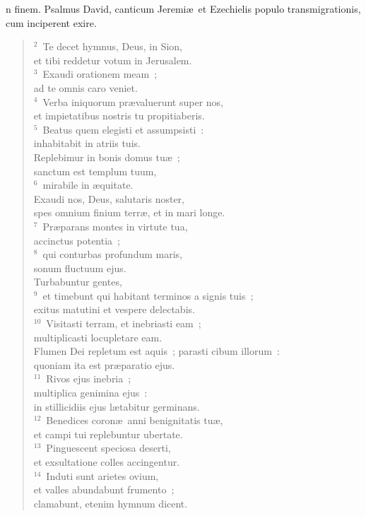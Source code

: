 \bchapter
{}n finem. Psalmus David, canticum Jeremi\ae\ et Ezechielis populo transmigrationis, cum inciperent exire.
\begin{flushleft}\begin{verse}\vspace{6pt}${}^{2}$~Te decet hymnus, Deus, in Sion,\\ et tibi reddetur votum in Jerusalem.\\
${}^{3}$~Exaudi orationem meam~;\\ ad te omnis caro veniet.\\
${}^{4}$~Verba iniquorum pr\ae valuerunt super nos,\\ et impietatibus nostris tu propitiaberis.\\
${}^{5}$~Beatus quem elegisti et assumpsisti~:\\ inhabitabit in atriis tuis.\\ Replebimur in bonis domus tu\ae~;\\ sanctum est templum tuum,\\
${}^{6}$~mirabile in \ae quitate.\\ Exaudi nos, Deus, salutaris noster,\\ spes omnium finium terr\ae , et in mari longe.\\
${}^{7}$~Pr\ae parans montes in virtute tua,\\ accinctus potentia~;\\
${}^{8}$~qui conturbas profundum maris,\\ sonum fluctuum ejus.\\ Turbabuntur gentes,\\
${}^{9}$~et timebunt qui habitant terminos a signis tuis~;\\ exitus matutini et vespere delectabis.\\
${}^{10}$~Visitasti terram, et inebriasti eam~;\\ multiplicasti locupletare eam.\\ Flumen Dei repletum est aquis~; parasti cibum illorum~:\\ quoniam ita est pr\ae paratio ejus.\\
${}^{11}$~Rivos ejus inebria~;\\ multiplica genimina ejus~:\\ in stillicidiis ejus l\ae tabitur germinans.\\
${}^{12}$~Benedices coron\ae\ anni benignitatis tu\ae ,\\ et campi tui replebuntur ubertate.\\
${}^{13}$~Pinguescent speciosa deserti,\\ et exsultatione colles accingentur.\\
${}^{14}$~Induti sunt arietes ovium,\\ et valles abundabunt frumento~;\\ clamabunt, etenim hymnum dicent.\end{verse}\end{flushleft}



